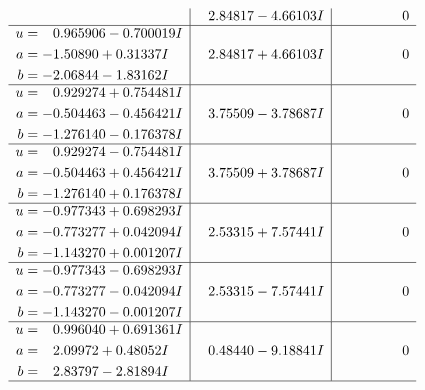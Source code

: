 \documentclass[1p]{elsarticle_modified}
\theoremstyle{definition}
\begin{document}
$$\begin{array}{c|c|c}
 & \phantom{-}2.84817 - 4.66103 I & \phantom{-0.000000 } 0 \\ \hline\begin{aligned}
u &= \phantom{-}0.965906 - 0.700019 I \\
a &= -1.50890 + 0.31337 I \\
b &= -2.06844 - 1.83162 I\end{aligned}
 & \phantom{-}2.84817 + 4.66103 I & \phantom{-0.000000 } 0 \\ \hline\begin{aligned}
u &= \phantom{-}0.929274 + 0.754481 I \\
a &= -0.504463 - 0.456421 I \\
b &= -1.276140 - 0.176378 I\end{aligned}
 & \phantom{-}3.75509 - 3.78687 I & \phantom{-0.000000 } 0 \\ \hline\begin{aligned}
u &= \phantom{-}0.929274 - 0.754481 I \\
a &= -0.504463 + 0.456421 I \\
b &= -1.276140 + 0.176378 I\end{aligned}
 & \phantom{-}3.75509 + 3.78687 I & \phantom{-0.000000 } 0 \\ \hline\begin{aligned}
u &= -0.977343 + 0.698293 I \\
a &= -0.773277 + 0.042094 I \\
b &= -1.143270 + 0.001207 I\end{aligned}
 & \phantom{-}2.53315 + 7.57441 I & \phantom{-0.000000 } 0 \\ \hline\begin{aligned}
u &= -0.977343 - 0.698293 I \\
a &= -0.773277 - 0.042094 I \\
b &= -1.143270 - 0.001207 I\end{aligned}
 & \phantom{-}2.53315 - 7.57441 I & \phantom{-0.000000 } 0 \\ \hline\begin{aligned}
u &= \phantom{-}0.996040 + 0.691361 I \\
a &= \phantom{-}2.09972 + 0.48052 I \\
b &= \phantom{-}2.83797 - 2.81894 I\end{aligned}
 & \phantom{-}0.48440 - 9.18841 I & \phantom{-0.000000 } 0\\
 \hline 
 \end{array}$$\newpage$$\begin{array}{c|c|c}  

\end{array}$$
\end{document}
